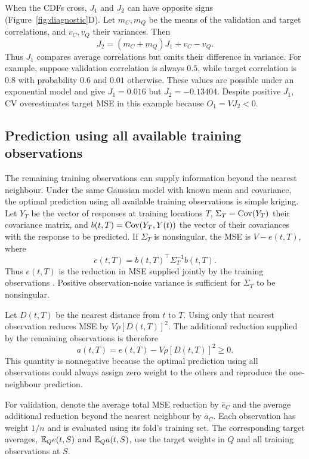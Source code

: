 When the CDFs cross, $J_1$ and $J_2$ can have opposite signs (Figure~\ref{fig:diagnostic}D). Let $m_C,m_Q$ be the means of the validation and target correlations, and $v_C,v_Q$ their variances. Then
\begin{equation}
 J_2=(m_C+m_Q)J_1+v_C-v_Q.\label{eq:moments}
\end{equation}
Thus $J_1$ compares average correlations but omits their difference in variance. For example, suppose validation correlation is always $0.5$, while target correlation is $0.8$ with probability $0.6$ and $0.01$ otherwise. These values are possible under an exponential model and give $J_1=0.016$ but $J_2=-0.13404$. Despite positive $J_1$, CV overestimates target MSE in this example because $O_1=VJ_2<0$.



\subsection{Prediction using all available training observations}
The remaining training observations can supply information beyond the nearest neighbour. Under the same Gaussian model with known mean and covariance, the optimal prediction using all available training observations is simple kriging. Let $Y_T$ be the vector of responses at training locations $T$, $\Sigma_T=\operatorname{Cov}(Y_T)$ their covariance matrix, and $b(t,T)=\operatorname{Cov}(Y_T,Y(t))$ the vector of their covariances with the response to be predicted. If $\Sigma_T$ is nonsingular, the MSE is $V-e(t,T)$, where
\[
 e(t,T)=b(t,T)^\top\Sigma_T^{-1}b(t,T).
\]
Thus $e(t,T)$ is the reduction in MSE supplied jointly by the training observations \citep{rasmussen2006gpml}. Positive observation-noise variance is sufficient for $\Sigma_T$ to be nonsingular.

Let $D(t,T)$ be the nearest distance from $t$ to $T$. Using only that nearest observation reduces MSE by $V\rho[D(t,T)]^2$. The additional reduction supplied by the remaining observations is therefore
\[
 a(t,T)=e(t,T)-V\rho[D(t,T)]^2\geq0.
\]
This quantity is nonnegative because the optimal prediction using all observations could always assign zero weight to the others and reproduce the one-neighbour prediction.

For validation, denote the average total MSE reduction by $\overline{e}_C$ and the average additional reduction beyond the nearest neighbour by $\overline{a}_C$. Each observation has weight $1/n$ and is evaluated using its fold's training set. The corresponding target averages, $\mathbb{E}_Q e(t,S)$ and $\mathbb{E}_Q a(t,S)$, use the target weights in $Q$ and all training observations at $S$.

